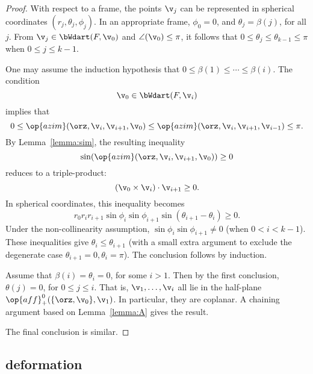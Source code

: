 \begin{proof}  
  With respect to a frame, the points $\v_j$ can be represented in
  spherical coordinates $(r_j,\theta_j,\phi_j)$.  In an appropriate
  frame, $\phi_0=0$, and $\theta_j=\beta(j)$, for all $j$.  From
  $\v_j\in \bWdart(F,\v_0)$ and $\angle(\v_0)\le\pi$, it follows that
  $0\le\theta_j\le\theta_{k-1}\le\pi$ when $0\le j\le k-1$.

One may assume the induction hypothesis that $0\le \beta(1)\le\cdots\le
\beta(i)$.  The condition
\begin{displaymath}
\v_0\in \bWdart(F,\v_i)
\end{displaymath}
implies that
\begin{displaymath}
  0 \le \op{azim}(\orz,\v_i,\v_{i+1},\v_0)
\le \op{azim}(\orz,\v_i,\v_{i+1},\v_{i-1})\le\pi.
\end{displaymath}
By Lemma~\ref{lemma:sim}, the resulting inequality
\begin{displaymath}
\sin(\op{azim}(\orz,\v_i,\v_{i+1},\v_0))\ge 0
\end{displaymath}
reduces to a triple-product:
\begin{displaymath}
(\v_0 \times \v_i)\cdot \v_{i+1}\ge 0.
\end{displaymath}
In spherical coordinates, this inequality becomes
\begin{displaymath}
r_0r_ir_{i+1}\sin\phi_i\sin\phi_{i+1}\sin(\theta_{i+1}-\theta_i)\ge0.
\end{displaymath}
Under the non-collinearity assumption, $\sin\phi_i\sin\phi_{i+1}\ne0$
(when $0< i < k-1$).  These inequalities give
$\theta_i\le\theta_{i+1}$ (with a small extra argument to exclude the
degenerate case $\theta_{i+1}=0,\theta_i=\pi$).  The conclusion
follows by induction.

Assume that $\beta(i)=\theta_i=0$, for some $i>1$.  Then by the first
conclusion, $\theta(j)=0$, for $0\le j\le i$.  That is, 
$\v_1,\ldots,\v_i$ all lie in the half-plane
$\op{aff}^0_+(\{\orz,\v_0\},\v_1)$.  In particular, they are coplanar.
A chaining argument based on Lemma~\ref{lemma:A} gives the result.

The final conclusion is similar.
\end{proof}



\subsection{deformation}\label{sec:deformation}


